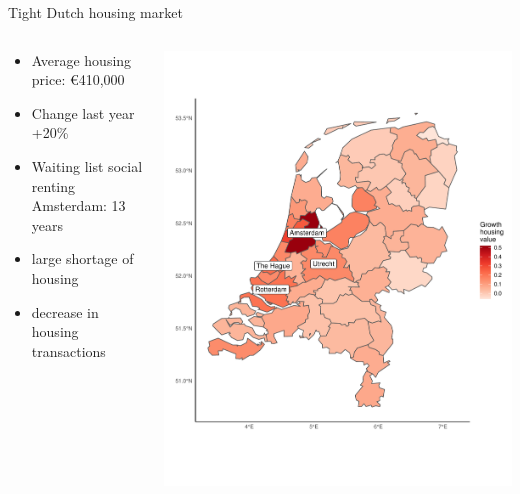 \documentclass{beamer}
\begin{document}
\begin{frame}{Tight Dutch housing market}
	\begin{columns}
		\begin{column}{0.5\textwidth}
			\begin{itemize}
				\item Average housing price: \euro 410,000 \newline
				\item Change last year +20\% \newline
				\item Waiting list social renting Amsterdam: 13 years \newline
				\item large \alert{shortage} of housing \newline
				\item decrease in housing \alert{transactions}
			\end{itemize}
		\end{column}
		\begin{column}{0.5\textwidth}
			\begin{center}
				\includegraphics[width=1\textwidth]{../../fig/growth_woz}
			\end{center}
		\end{column}
	\end{columns}
\end{frame}
\end{document}
